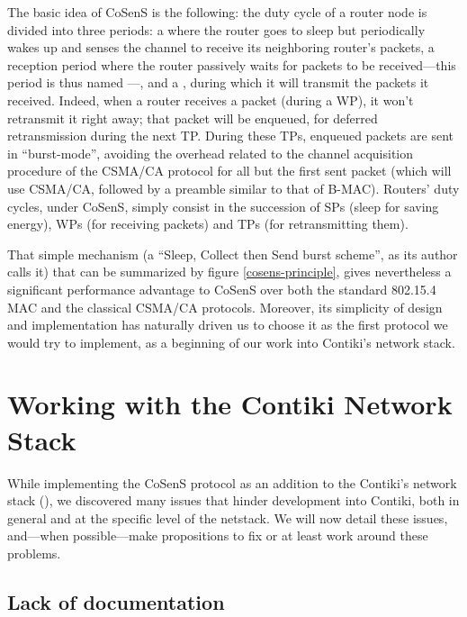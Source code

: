 \documentclass[12pt,a4paper]{article}
\begin{document}
The basic idea of CoSenS is the following: the duty cycle of a router node
is divided into three periods: a  where the router
goes to sleep but periodically wakes up and senses the channel to receive
its neighboring router's packets, a reception period where the router
passively waits for packets to be received---this period is thus named
---, and a , during
which it will transmit the packets it received. Indeed, when a router
receives a packet (during a WP), it won't retransmit it right away;
that packet will be enqueued, for deferred retransmission during
the next TP. During these TPs, enqueued packets are sent in ``burst-mode'',
avoiding the overhead related to the channel acquisition procedure of the
CSMA/CA protocol for all but the first sent packet (which will use CSMA/CA,
followed by a preamble similar to that of B-MAC). Routers' duty cycles,
under CoSenS, simply consist in the succession of SPs (sleep for saving
energy), WPs (for receiving packets) and TPs (for retransmitting them).

That simple mechanism (a ``Sleep, Collect then Send burst scheme'', as its
author calls it) that can be summarized by figure \ref{cosens-principle},
gives nevertheless a significant performance advantage to CoSenS over
both the standard 802.15.4 MAC and the classical CSMA/CA protocols.
Moreover, its simplicity of design and implementation has naturally
driven us to choose it as the first protocol we would try to implement,
as a beginning of our work into Contiki's network stack.


\section{Working with the Contiki Network Stack}

While implementing the CoSenS protocol as an addition to the Contiki's
network stack (), we discovered many issues that
hinder development into Contiki, both in general and at the specific level
of the netstack. We will now detail these issues, and---when possible---make
propositions to fix or at least work around these problems.


\subsection{Lack of documentation}
\end{document}
